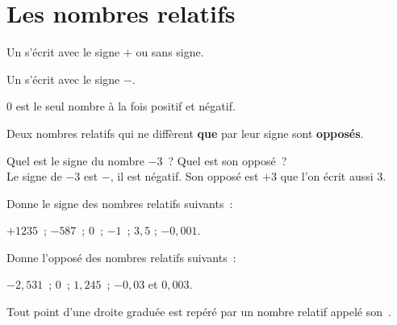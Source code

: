 \section{Les nombres relatifs}


\vspace{4em}

\begin{definition}
Un  s'écrit avec le signe $+$ ou sans signe.

Un  s'écrit avec le signe $-$. 

0 est le seul nombre à la fois positif et négatif.

Deux nombres relatifs qui ne diffèrent \textbf{que} par leur signe sont \textbf{opposés}.
\end{definition}

\vspace{4em}


\begin{methode*1}



\begin{exemple*1}
Quel est le signe du nombre $-3$ ? Quel est son opposé ? \\[1em]
Le signe de $- 3$ est $-$, il est négatif. Son opposé est $+ 3$ que l'on écrit aussi 3.
\end{exemple*1}

\exercice 
Donne le signe des nombres relatifs suivants :

$+1235$ ; $-587$ ; $0$ ; $-1$ ;  $3,5$ ; $-0,001$.

\exercice 
Donne l'opposé des nombres relatifs suivants :

$-2,531$ ; $0$ ; $1,245$ ;  $-0,03$ et $0,003$.

\end{methode*1}


\newpage


\begin{aconnaitre}
Tout point d'une droite graduée est repéré par un nombre relatif appelé son .


\end{aconnaitre}

